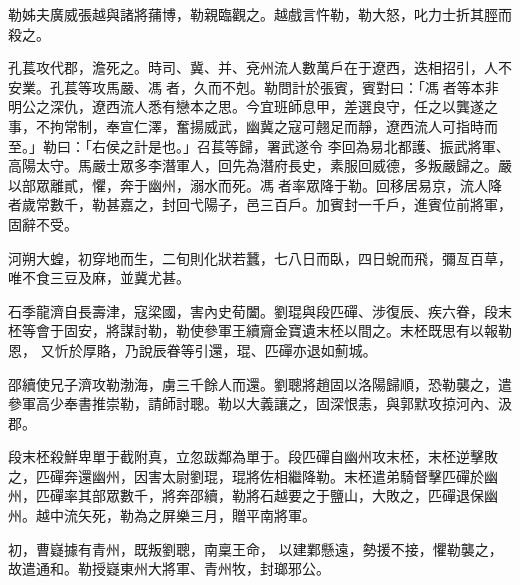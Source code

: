 \begin{pinyinscope}
 勒姊夫廣威張越與諸將蒱博，勒親臨觀之。越戲言忤勒，勒大怒，叱力士折其脛而殺之。



 孔萇攻代郡，澹死之。時司、冀、并、兗州流人數萬戶在于遼西，迭相招引，人不安業。孔萇等攻馬嚴、馮者，久而不剋。勒問計於張賓，賓對曰：「馮者等本非明公之深仇，遼西流人悉有戀本之思。今宜班師息甲，差選良守，任之以龔遂之事，不拘常制，奉宣仁澤，奮揚威武，幽冀之寇可翹足而靜，遼西流人可指時而至。」勒曰：「右侯之計是也。」召萇等歸，署武遂令
 李回為易北都護、振武將軍、高陽太守。馬嚴士眾多李潛軍人，回先為潛府長史，素服回威德，多叛嚴歸之。嚴以部眾離貳，懼，奔于幽州，溺水而死。馮者率眾降于勒。回移居易京，流人降者歲常數千，勒甚嘉之，封回弋陽子，邑三百戶。加賓封一千戶，進賓位前將軍，固辭不受。



 河朔大蝗，初穿地而生，二旬則化狀若蠶，七八日而臥，四日蛻而飛，彌亙百草，唯不食三豆及麻，並冀尤甚。



 石季龍濟自長壽津，寇梁國，害內史荀闔。劉琨與段匹磾、涉復辰、疾六眷，段末柸等會于固安，將謀討勒，勒使參軍王續齎金寶遺末柸以間之。末柸既思有以報勒恩，
 又忻於厚賂，乃說辰眷等引還，琨、匹磾亦退如薊城。



 邵續使兄子濟攻勒渤海，虜三千餘人而還。劉聰將趙固以洛陽歸順，恐勒襲之，遣參軍高少奉書推崇勒，請師討聰。勒以大義讓之，固深恨恚，與郭默攻掠河內、汲郡。



 段末柸殺鮮卑單于截附真，立忽跋鄰為單于。段匹磾自幽州攻末柸，末柸逆擊敗之，匹磾奔還幽州，因害太尉劉琨，琨將佐相繼降勒。末柸遣弟騎督擊匹磾於幽州，匹磾率其部眾數千，將奔邵續，勒將石越要之于鹽山，大敗之，匹磾退保幽州。越中流矢死，勒為之屏樂三月，贈平南將軍。



 初，曹嶷據有青州，既叛劉聰，南稟王命，
 以建鄴懸遠，勢援不接，懼勒襲之，故遣通和。勒授嶷東州大將軍、青州牧，封瑯邪公。




\end{pinyinscope}
